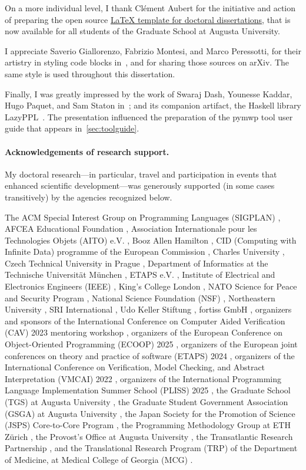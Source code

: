 On a more individual level,
I thank Clément Aubert for the initiative and action of preparing the open source \href{https://github.com/the-au-forml-lab/au_ccs_dissertation_template}{LaTeX
template for doctoral dissertations}, that is now available for all students of the Graduate School at Augusta University.

I appreciate Saverio Giallorenzo, Fabrizio Montesi, and Marco Peressotti, for their artistry in styling code blocks in~\cite{giallorenzo2024},
and for sharing those sources on arXiv.
The same style is used throughout this dissertation.

Finally, I was greatly impressed by the work of Swaraj Dash, Younesse Kaddar, Hugo Paquet, and Sam Staton in~\cite{dash2023};
and its companion artifact, the Haskell library LazyPPL~\cite{dash2023b}.
The presentation influenced the preparation of the pymwp tool user guide that appears in~\autoref{sec:toolguide}.

\paragraph*{Acknowledgements of research support.}
My doctoral research---in particular, travel and participation in events that enhanced scientific development---was generously supported (in some cases transitively) by the agencies recognized below.

The ACM Special Interest Group on Programming Languages (SIGPLAN)%
, AFCEA Educational Foundation%
, Association Internationale pour les Technologies Objets (AITO) e.V.%
, Booz Allen Hamilton%
, CID (Computing with Infinite Data) programme of the European Commission%
, Charles University%
, Czech Technical University in Prague%
, Department of Informatics at the Technische Universität München%
, ETAPS e.V.%
, Institute of Electrical and Electronics Engineers (IEEE)%
, King's College London%
, NATO Science for Peace and Security Program%
, National Science Foundation (NSF)%
, Northeastern University%
, SRI International%
, Udo Keller Stiftung%
, fortiss GmbH%
, organizers and sponsors of the International Conference on Computer Aided Verification (CAV) 2023 mentoring workshop%
, organizers of the European Conference on Object-Oriented Programming (ECOOP) 2025%
, organizers of the European joint conferences on theory and practice of software (ETAPS) 2024%
, organizers of the International Conference on Verification, Model Checking, and Abstract Interpretation (VMCAI) 2022%
, organizers of the International Programming Language Implementation Summer School (PLISS) 2025%
, the Graduate School (TGS) at Augusta University%
, the Graduate Student Government Association (GSGA) at Augusta University%
, the Japan Society for the Promotion of Science (JSPS) Core-to-Core Program%
, the Programming Methodology Group at ETH Zürich%
, the Provost's Office at Augusta University%
, the Transatlantic Research Partnership%
, and the Translational Research Program (TRP) of the Department of Medicine, at Medical College of Georgia (MCG)%
.